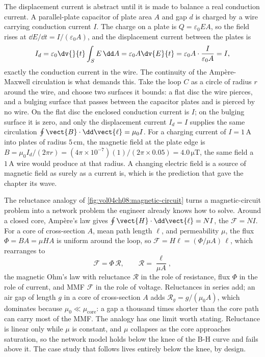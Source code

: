 The displacement current is abstract until it is made to balance a real
conduction current. A parallel-plate capacitor of plate area $A$ and
gap $d$ is charged by a wire carrying conduction current $I$. The charge
on a plate is $Q = \varepsilon_0 E A$, so the field rises at $\dd E/\dd t
= I/(\varepsilon_0 A)$, and the displacement current between the plates
is
\[
I_d = \varepsilon_0\dv{}{t}\int_{S} E\,\dd A = \varepsilon_0 A
\dv{E}{t} = \varepsilon_0 A\cdot\frac{I}{\varepsilon_0 A} = I,
\]
exactly the conduction current in the wire. The continuity of the
Amp\`ere-Maxwell circulation is what demands this. Take the loop $C$ as
a circle of radius $r$ around the wire, and choose two surfaces it
bounds: a flat disc the wire pierces, and a bulging surface that passes
between the capacitor plates and is pierced by no wire. On the flat disc
the enclosed conduction current is $I$; on the bulging surface it is
zero, and only the displacement current $I_d = I$ supplies the same
circulation $\oint\vect{B}\cdot\dd\vect{\ell} = \mu_0 I$. For a charging
current of $I = 1\,\si{\ampere}$ into plates of radius $5\,\si{\centi
\meter}$, the magnetic field at the plate edge is $B = \mu_0 I_d/(2\pi r)
= (4\pi\times 10^{-7})(1)/(2\pi\times 0.05) = 4.0\,\si{\micro\tesla}$,
the same field a $1\,\si{\ampere}$ wire would produce at that radius. A
changing electric field is a source of magnetic field as surely as a
current is, which is the prediction that gave the chapter its wave.



\begin{mastery}
The reluctance analogy of \cref{fig:vol04ch08:magnetic-circuit} turns a
magnetic-circuit problem into a network problem the engineer already
knows how to solve. Around a closed core,
Amp\`ere's law gives $\oint\vect{H}\cdot\dd\vect{\ell} = NI$, the
 $\mathcal{F} = NI$. For a core of
cross-section $A$, mean path length $\ell$, and permeability $\mu$, the
flux $\Phi = BA = \mu H A$ is uniform around the loop, so
$\mathcal{F} = H\ell = (\Phi/\mu A)\,\ell$, which rearranges to
\[
\mathcal{F} = \Phi\,\mathcal{R}, \qquad \mathcal{R} =
\frac{\ell}{\mu A},
\]
the magnetic Ohm's law with reluctance $\mathcal{R}$ in the role of
resistance, flux $\Phi$ in the role of current, and MMF $\mathcal{F}$ in
the role of voltage. Reluctances in series add; an air gap of length
$g$ in a core of cross-section $A$ adds $\mathcal{R}_g = g/(\mu_0 A)$,
which dominates because $\mu_0 \ll \mu_{\text{core}}$: a gap a thousand
times shorter than the core path can carry most of the MMF. The analogy
has one limit worth stating. Reluctance is linear only while $\mu$ is
constant, and $\mu$ collapses as the core approaches saturation, so the
network model holds below the knee of the B-H curve and fails above it.
The case study that follows lives entirely below the knee, by design.
\end{mastery}

